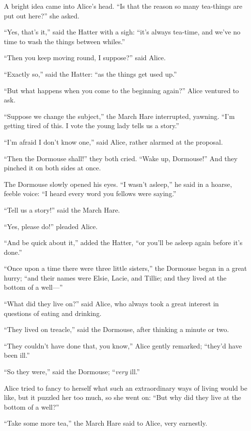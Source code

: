 \documentclass[book, 20pt]{extbook}
\begin{document}
A bright idea came into Alice's head. ``Is that the reason so many
tea-things are put out here?'' she asked.

``Yes, that's it,'' said the Hatter with a sigh: ``it's always tea-time,
and we've no time to wash the things between whiles.''

``Then you keep moving round, I suppose?'' said Alice.

``Exactly so,'' said the Hatter: ``as the things get used up.''

``But what happens when you come to the beginning again?'' Alice
ventured to ask.

``Suppose we change the subject,'' the March Hare interrupted, yawning.
``I'm getting tired of this. I vote the young lady tells us a story.''

``I'm afraid I don't know one,'' said Alice, rather alarmed at the
proposal.

``Then the Dormouse shall!'' they both cried. ``Wake up, Dormouse!'' And
they pinched it on both sides at once.

The Dormouse slowly opened his eyes. ``I wasn't asleep,'' he said in a
hoarse, feeble voice: ``I heard every word you fellows were saying.''

``Tell us a story!'' said the March Hare.

``Yes, please do!'' pleaded Alice.

``And be quick about it,'' added the Hatter, ``or you'll be asleep again
before it's done.''

``Once upon a time there were three little sisters,'' the Dormouse began
in a great hurry; ``and their names were Elsie, Lacie, and Tillie; and
they lived at the bottom of a well---''

``What did they live on?'' said Alice, who always took a great interest
in questions of eating and drinking.

``They lived on treacle,'' said the Dormouse, after thinking a minute or
two.

``They couldn't have done that, you know,'' Alice gently remarked;
``they'd have been ill.''

``So they were,'' said the Dormouse; ``\emph{very} ill.''

Alice tried to fancy to herself what such an extraordinary ways of
living would be like, but it puzzled her too much, so she went on: ``But
why did they live at the bottom of a well?''

``Take some more tea,'' the March Hare said to Alice, very earnestly.
\end{document}
